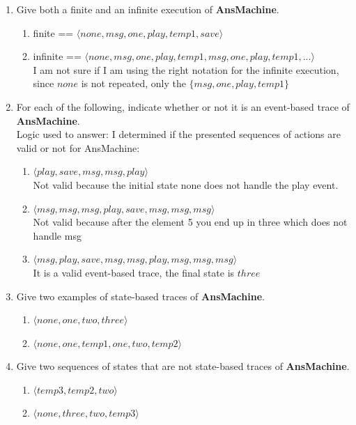 \documentclass{article}
\begin{document}
\begin{enumerate}
\begin{enumerate}
 \item Give both a finite and an infinite execution of
   {\bf AnsMachine}.
   \begin{enumerate}
   \item finite == $\langle none, msg, one, play, temp1, save \rangle$
   \item infinite == $\langle none, msg, one, play, temp1, msg, one, play, temp1, ... \rangle$ \\
     I am not sure if I am using the right notation for the infinite execution, since $none$ is not repeated, only the $\{msg, one, play, temp1\}$ 
   \end{enumerate}
 \item For each of the following, indicate whether or not it is an event-based trace of
   {\bf AnsMachine}.\\
   Logic used to answer: I determined if the  presented sequences of actions are valid or not for AnsMachine:
 \begin{enumerate}
 \item  $\langle play, save, msg, msg, play \rangle$ \\
   Not valid because the initial state none does not handle the play event. \\
 \item  $\langle msg, msg, msg, play, save, msg, msg, msg \rangle$ \\
   Not valid because after the element {5} you end up in three which does not handle msg \\
 \item  $\langle msg, play, save, msg, msg, play, msg, msg, msg \rangle$ \\
   It is a valid event-based trace, the final state is $three$ \\
 \end{enumerate}
 \item Give two examples of state-based traces of
   {\bf AnsMachine}.
   \begin{enumerate}
   \item $\langle none, one, two, three \rangle$
   \item $\langle none, one, temp1, one, two, temp2 \rangle$
     \end{enumerate}
 \item Give two sequences of
   states that are not state-based traces of {\bf AnsMachine}.
   \begin{enumerate}
   \item $\langle temp3, temp2, two \rangle$
   \item $\langle none, three, two, temp3 \rangle$

\end{enumerate}
\end{enumerate}
\end{enumerate}
\end{document}
